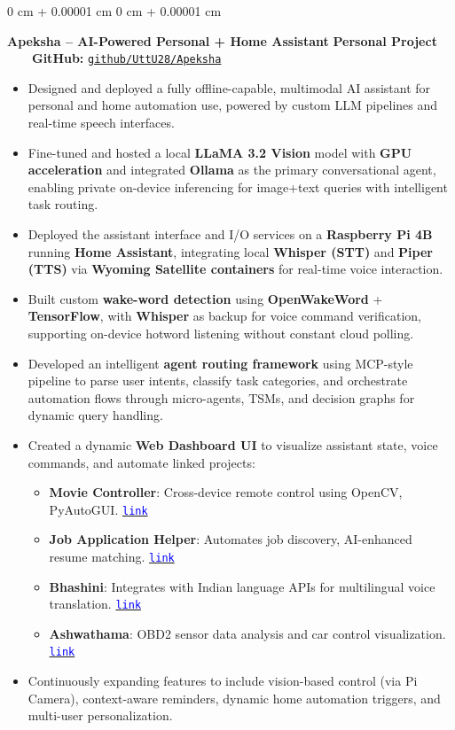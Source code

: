\documentclass[10pt, letterpaper]{article}
\newenvironment{highlights}{
    \begin{itemize}[
        topsep=0.10 cm,
        parsep=0.10 cm,
        partopsep=0pt,
        itemsep=0pt,
        leftmargin=0 cm + 10pt
    ]
}{
    \end{itemize}
} %
\newenvironment{onecolentry}{
    \begin{adjustwidth}{
        0 cm + 0.00001 cm
    }{
        0 cm + 0.00001 cm
    }
}{
    \end{adjustwidth}
} %
\begin{document}
\begin{onecolentry}
	\textbf{Apeksha – AI-Powered Personal + Home Assistant} \hfill \textbf{Personal Project} \ \ \ \ \textbf{GitHub:} \href{https://github.com/UttU28/Apeksha}{\texttt{github/UttU28/Apeksha}}
	
	\begin{highlights}
		\item Designed and deployed a fully offline-capable, multimodal AI assistant for personal and home automation use, powered by custom LLM pipelines and real-time speech interfaces.
		\item Fine-tuned and hosted a local \textbf{LLaMA 3.2 Vision} model with \textbf{GPU acceleration} and integrated \textbf{Ollama} as the primary conversational agent, enabling private on-device inferencing for image+text queries with intelligent task routing.
		\item Deployed the assistant interface and I/O services on a \textbf{Raspberry Pi 4B} running \textbf{Home Assistant}, integrating local \textbf{Whisper (STT)} and \textbf{Piper (TTS)} via \textbf{Wyoming Satellite containers} for real-time voice interaction.
		\item Built custom \textbf{wake-word detection} using \textbf{OpenWakeWord} + \textbf{TensorFlow}, with \textbf{Whisper} as backup for voice command verification, supporting on-device hotword listening without constant cloud polling.
		\item Developed an intelligent \textbf{agent routing framework} using MCP-style pipeline to parse user intents, classify task categories, and orchestrate automation flows through micro-agents, TSMs, and decision graphs for dynamic query handling.
		\item Created a dynamic \textbf{Web Dashboard UI} to visualize assistant state, voice commands, and automate linked projects:
			\begin{highlights}
				\item \textbf{Movie Controller}: Cross-device remote control using OpenCV, PyAutoGUI. \href{https://github.com/UttU28/Movie_Controller_2}{\textcolor{blue}{\texttt{link}}}
				\item \textbf{Job Application Helper}: Automates job discovery, AI-enhanced resume matching. \href{https://github.com/UttU28/Job-Application-Helper}{\textcolor{blue}{\texttt{link}}}
				\item \textbf{Bhashini}: Integrates with Indian language APIs for multilingual voice translation. \href{https://github.com/UttU28/Apeksha_Frontend/}{\textcolor{blue}{\texttt{link}}}
				\item \textbf{Ashwathama}: OBD2 sensor data analysis and car control visualization. \href{https://github.com/UttU28/Apeksha_Frontend/}{\textcolor{blue}{\texttt{link}}}
			\end{highlights}
		\item Continuously expanding features to include vision-based control (via Pi Camera), context-aware reminders, dynamic home automation triggers, and multi-user personalization.
	\end{highlights}
\end{onecolentry}
	
\end{document}
